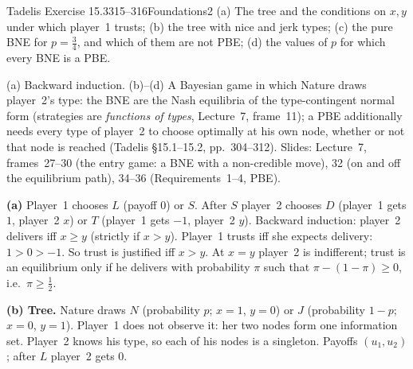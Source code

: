 \begin{exsol}{Tadelis Exercise 15.3}{315--316}{Foundations}{2}
\asked (a) The tree and the conditions on $x, y$ under which player~1 trusts; (b) the tree with nice and
jerk types; (c) the pure BNE for $p = \frac34$, and which of them are not PBE; (d) the values of $p$ for
which every BNE is a PBE.

\method (a) Backward induction. (b)--(d) A Bayesian game in which Nature draws player~2's type: the BNE
are the Nash equilibria of the type-contingent normal form (strategies are \emph{functions of types},
Lecture~7, frame~11); a PBE additionally needs every type of player~2 to choose optimally at his own node,
whether or not that node is reached (Tadelis \S15.1--15.2, pp.~304--312). Slides: Lecture~7, frames~27--30
(the entry game: a BNE with a non-credible move), 32 (on and off the equilibrium path), 34--36
(Requirements~1--4, PBE).

\solution
\textbf{(a)} Player~1 chooses $L$ (payoff $0$) or $S$. After $S$ player~2 chooses $D$ (player~1 gets $1$,
player~2 $x$) or $T$ (player~1 gets $-1$, player~2 $y$). Backward induction: player~2 delivers iff
$x \ge y$ (strictly if $x > y$). Player~1 trusts iff she expects delivery: $1 > 0 > -1$. So trust is
justified iff $x > y$. At $x = y$ player~2 is indifferent; trust is an equilibrium only if he delivers
with probability $\pi$ such that $\pi - (1 - \pi) \ge 0$, i.e.\ $\pi \ge \frac12$.

\textbf{(b) Tree.} Nature draws $N$ (probability $p$; $x = 1$, $y = 0$) or $J$ (probability $1-p$;
$x = 0$, $y = 1$). Player~1 does not observe it: her two nodes form one information set. Player~2 knows his
type, so each of his nodes is a singleton. Payoffs $(u_1, u_2)$; after $L$ player~2 gets $0$.
\begin{center}
\end{center}


\end{exsol}
